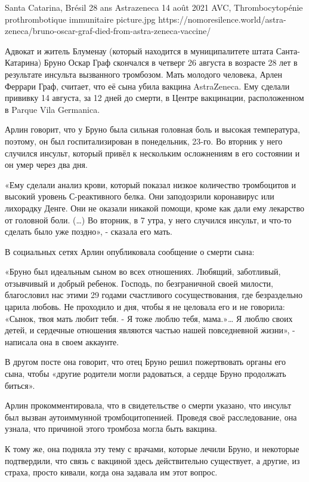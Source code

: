           {Santa Catarina, Brésil}
          {28 ans}
          {Astrazeneca}
          {14 août 2021}
          {AVC,  Thrombocytopénie prothrombotique immunitaire}
          {picture.jpg}
          {https://nomoresilence.world/astra-zeneca/bruno-oscar-graf-died-from-astra-zeneca-vaccine/}
          {
Адвокат и житель Блуменау (который находится в муниципалитете штата
Санта-Катарина) Бруно Оскар Граф скончался в четверг 26 августа в возрасте 28
лет в результате инсульта вызванного тромбозом. Мать молодого человека, Арлен
Феррари Граф, считает, что её сына убила вакцина AstraZeneca. Ему сделали
прививку 14 августа, за 12 дней до смерти, в Центре вакцинации, расположенном в
Parque Vila Germanica.

Арлин говорит, что у Бруно была сильная головная боль и высокая температура,
поэтому, он был госпитализирован в понедельник, 23-го. Во вторник у него
случился инсульт, который привёл к нескольким осложнениям в его состоянии и он
умер через два дня.

«Ему сделали анализ крови, который показал низкое количество тромбоцитов и
высокий уровень С-реактивного белка. Они заподозрили коронавирус или лихорадку
Денге. Они не оказали никакой помощи, кроме как дали ему лекарство от головной
боли. (…) Во вторник, в 7 утра, у него случился инсульт, и что-то сделать было
уже поздно», - сказала его мать.

В социальных сетях Арлин опубликовала сообщение о смерти сына:

«Бруно был идеальным сыном во всех отношениях. Любящий, заботливый, отзывчивый и
добрый ребенок. Господь, по безграничной своей милости, благословил нас этими 29
годами счастливого сосуществования, где безраздельно царила любовь. Не проходило
и дня, чтобы я не целовала его и не говорила: «Сынок, твоя мать любит тебя. - Я
тоже люблю тебя, мама.»… Я люблю своих детей, и сердечные отношения являются
частью нашей повседневной жизни», - написала она в своем аккаунте.

В другом посте она говорит, что отец Бруно решил пожертвовать органы его сына,
чтобы «другие родители могли радоваться, а сердце Бруно продолжать биться».

Арлин прокомментировала, что в свидетельстве о смерти указано, что инсульт был
вызван аутоиммунной тромбоцитопенией. Проведя своё расследование, она узнала,
что причиной этого тромбоза могла быть вакцина.

К тому же, она подняла эту тему с врачами, которые лечили Бруно, и некоторые
подтвердили, что связь с вакциной здесь действительно существует, а другие, из
страха, просто кивали, когда она задавала им этот вопрос.

}
